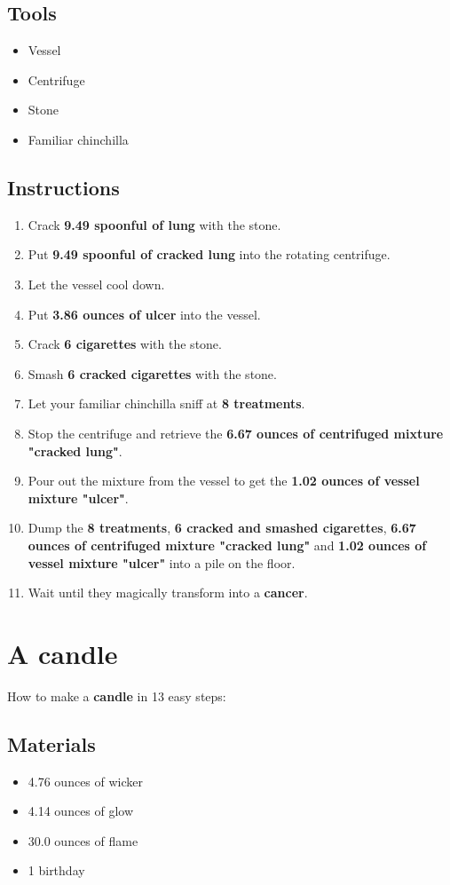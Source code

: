 \documentclass{article}
\begin{document}
\subsection{Tools}\begin{itemize}
\item 
Vessel
\item 
Centrifuge
\item 
Stone
\item 
Familiar chinchilla
\end{itemize}
\subsection{Instructions}\begin{enumerate}
\item 
Crack \textbf{9.49 spoonful of lung} with the stone.
\item 
Put \textbf{9.49 spoonful of cracked lung} into the rotating centrifuge.
\item 
Let the vessel cool down.
\item 
Put \textbf{3.86 ounces of ulcer} into the vessel.
\item 
Crack \textbf{6 cigarettes} with the stone.
\item 
Smash \textbf{6 cracked cigarettes} with the stone.
\item 
Let your familiar chinchilla sniff at \textbf{8 treatments}.
\item 
Stop the centrifuge and retrieve the \textbf{6.67 ounces of centrifuged mixture "cracked lung"}.
\item 
Pour out the mixture from the vessel to get the \textbf{1.02 ounces of vessel mixture "ulcer"}.
\item 
Dump the \textbf{8 treatments}, \textbf{6 cracked and smashed cigarettes}, \textbf{6.67 ounces of centrifuged mixture "cracked lung"} and \textbf{1.02 ounces of vessel mixture "ulcer"} into a pile on the floor.
\item 
Wait until they magically transform into a \textbf{cancer}.
\end{enumerate}
\newpage
\section{A candle}How to make a \textbf{candle} in 13 easy steps:

\subsection{Materials}\begin{itemize}
\item 
4.76 ounces of wicker
\item 
4.14 ounces of glow
\item 
30.0 ounces of flame
\item 
1 birthday
\end{itemize}
\end{document}
